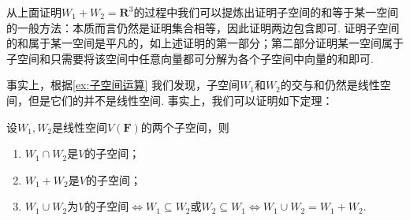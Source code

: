 从上面证明$W_1+W_2=\mathbf{R}^3$的过程中我们可以提炼出证明子空间的和等于某一空间的一般方法：本质而言仍然是证明集合相等，因此证明两边包含即可. 证明子空间的和属于某一空间是平凡的，如上述证明的第一部分；第二部分证明某一空间属于子空间和只需要将该空间中任意向量都可分解为各个子空间中向量的和即可.

事实上，根据\autoref{ex:子空间运算} 我们发现，子空间$W_1$和$W_2$的交与和仍然是线性空间，但是它们的并不是线性空间. 事实上，我们可以证明如下定理：
\begin{theorem}{}{}
    设$W_1,W_2$是线性空间$V(\mathbf{F})$的两个子空间，则
    \begin{enumerate}
        \item $W_1 \cap W_2$是$V$的子空间；

        \item $W_1 + W_2$是$V$的子空间；

        \item $W_1 \cup W_2$为$V$的子空间$\iff W_1 \subseteq W_2$或$W_2 \subseteq W_1 \iff W_1 \cup W_2=W_1+W_2$.
    \end{enumerate}
\end{theorem}

